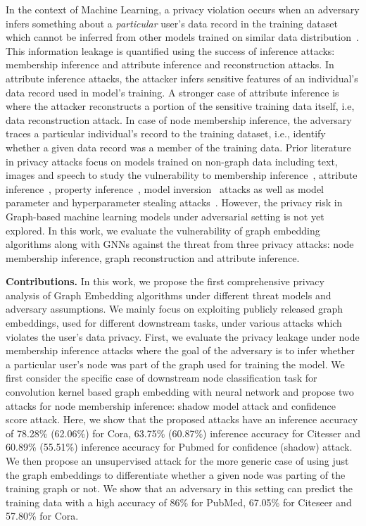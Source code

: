 In the context of Machine Learning, a privacy violation occurs when an adversary infers something about a \textit{particular} user's data record in the training dataset which cannot be inferred from other models trained on similar data distribution~\cite{membershipinf,whitebox}.
This information leakage is quantified using the success of inference attacks: membership inference and attribute inference and reconstruction attacks.
In attribute inference attacks, the attacker infers sensitive features of an individual's data record used in model's training.
A stronger case of attribute inference is where the attacker reconstructs a portion of the sensitive training data itself, i.e, data reconstruction attack.
In case of node membership inference, the adversary traces a particular individual's record to the training dataset, i.e., identify whether a given data record was a member of the training data.
Prior literature in privacy attacks focus on models trained on non-graph data including text, images and speech to study the vulnerability to membership inference~\cite{ndss19salem,membershipinf}, attribute inference~\cite{attributeinf,attributeinf2}, property inference~\cite{propertyinf}, model inversion~\cite{modelinversion} attacks as well as model parameter and hyperparameter stealing attacks~\cite{timing,stealml,8418595}.
However, the privacy risk in Graph-based machine learning models under adversarial setting is not yet explored.
In this work, we evaluate the vulnerability of graph embedding algorithms along with GNNs against the threat from three privacy attacks: node membership inference, graph reconstruction and attribute inference.

\noindent\textbf{Contributions.} In this work, we propose the first comprehensive privacy analysis of Graph Embedding algorithms under different threat models and adversary assumptions.
We mainly focus on exploiting publicly released graph embeddings, used for different downstream tasks, under various attacks which violates the user's data privacy.
First, we evaluate the privacy leakage under node membership inference attacks where the goal of the adversary is to infer whether a particular user's node was part of the graph used for training the model.
We first consider the specific case of downstream node classification task for convolution kernel based graph embedding with neural network and propose two attacks for node membership inference: shadow model attack and confidence score attack.
Here, we show that the proposed attacks have an inference accuracy of 78.28\% (62.06\%) for Cora, 63.75\% (60.87\%) inference accuracy for Citesser and 60.89\% (55.51\%) inference accuracy for Pubmed for confidence (shadow) attack.
We then propose an unsupervised attack for the more generic case of using just the graph embeddings to differentiate whether a given node was parting of the training graph or not.
We show that an adversary in this setting can predict the training data with a high accuracy of 86\% for PubMed, 67.05\% for Citeseer and 57.80\% for Cora.


